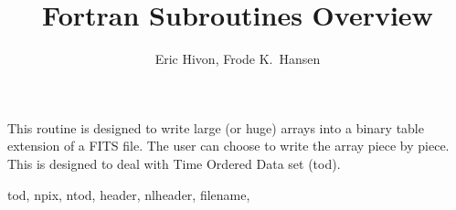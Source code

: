 
\sloppy


\title{\healpix Fortran Subroutines Overview}
 \section[write\_bintabh*]{ }
\label{sub:write_bintabh}
\author{Eric Hivon, Frode K.~Hansen}

\begin{facility}
{This routine is designed to write large (or huge) arrays into a binary table
extension of a FITS file. The user can
choose to write the array piece by piece. This is designed to deal with Time
Ordered Data set (tod).}
{\modFitstools}
\end{facility}

\begin{f90format}
{tod, npix, ntod, header, nlheader, filename, }
\end{f90format}
\aboutoptional

